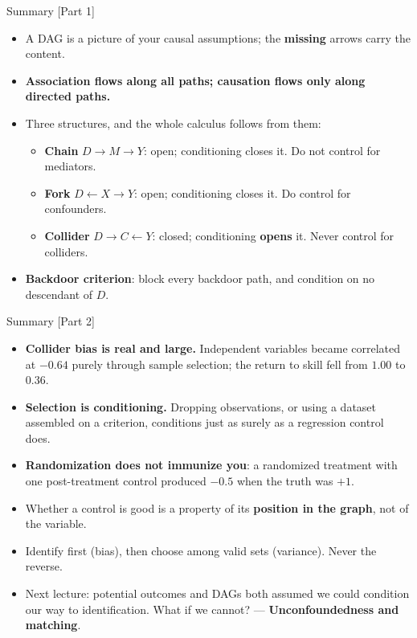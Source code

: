 \documentclass[
  11pt,
  ignorenonframetext,
  aspectratio=169,
]{beamer}
\providecommand{\tightlist}{%
  \setlength{\itemsep}{0pt}\setlength{\parskip}{0pt}}
\begin{document}
\begin{frame}{Summary {[}Part 1{]}}
\protect{}\label{summary-part-1}
\begin{itemize}
\tightlist
\item
  A DAG is a picture of your causal assumptions; the \textbf{missing}
  arrows carry the content.
\item
  \textbf{Association flows along all paths; causation flows only along
  directed paths.}
\item
  Three structures, and the whole calculus follows from them:

  \begin{itemize}
  \tightlist
  \item
    \textbf{Chain} \(D \to M \to Y\): open; conditioning closes it. Do
    not control for mediators.
  \item
    \textbf{Fork} \(D \leftarrow X \to Y\): open; conditioning closes
    it. Do control for confounders.
  \item
    \textbf{Collider} \(D \to C \leftarrow Y\): closed; conditioning
    \textbf{opens} it. Never control for colliders.
  \end{itemize}
\item
  \textbf{Backdoor criterion}: block every backdoor path, and condition
  on no descendant of \(D\).
\end{itemize}
\end{frame}

\begin{frame}{Summary {[}Part 2{]}}
\protect{}\label{summary-part-2}
\begin{itemize}
\tightlist
\item
  \textbf{Collider bias is real and large.} Independent variables became
  correlated at \(-0.64\) purely through sample selection; the return to
  skill fell from \(1.00\) to \(0.36\).
\item
  \textbf{Selection is conditioning.} Dropping observations, or using a
  dataset assembled on a criterion, conditions just as surely as a
  regression control does.
\item
  \textbf{Randomization does not immunize you}: a randomized treatment
  with one post-treatment control produced \(-0.5\) when the truth was
  \(+1\).
\item
  Whether a control is good is a property of its \textbf{position in the
  graph}, not of the variable.
\item
  Identify first (bias), then choose among valid sets (variance). Never
  the reverse.
\item
  Next lecture: potential outcomes and DAGs both assumed we could
  condition our way to identification. What if we cannot? ---
  \textbf{Unconfoundedness and matching}.
\end{itemize}
\end{frame}
\end{document}

